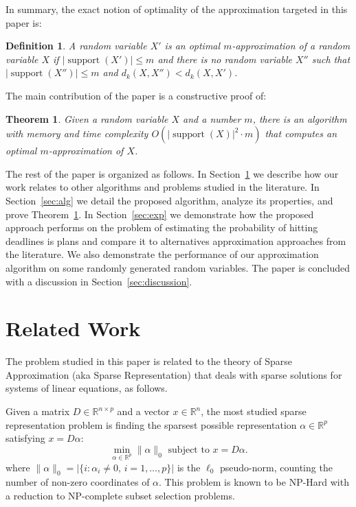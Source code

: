 \documentclass{article}
\newtheorem{definition}[thm]{Definition}
\newtheorem{theorem}[thm]{Theorem}
\DeclareMathOperator{\support}{support}
\begin{document}
In summary, the exact notion of optimality of the approximation targeted in this paper is:
\begin{definition}
	A random variable $X'$ is an optimal $m$-approximation of a random variable $X$ if $|\support(X')| \leq m$ and there is no random variable $X''$ such that $|\support(X'')| \leq m$ and $d_k(X,X'') < d_k(X,X')$.
\end{definition}

The main contribution of the paper is a constructive proof of:
\begin{theorem} \label{thm:main}
	Given a random variable $X$ and a number $m$, there is an algorithm with memory and time complexity $O(|\support(X)|^2 \cdot m)$  that computes an optimal $m$-approximation of $X$.
\end{theorem}

The rest of the paper is organized as follows. In Section~\ref{sec:rel-work} we describe how our work relates to other algorithms and problems studied in the literature. In Section~\ref{sec:alg} we detail the proposed algorithm, analyze its properties, and prove Theorem~\ref{thm:main}. In Section~\ref{sec:exp} we demonstrate how the proposed approach performs on the problem of estimating the probability of hitting deadlines is plans and compare it to alternatives approximation approaches from the literature. We also demonstrate the performance of our approximation algorithm on some randomly generated random variables. The paper is concluded with a discussion in Section~\ref{sec:discussion}.

\section{Related Work}
\label{sec:rel-work}
The problem studied in this paper is related to the theory of Sparse Approximation (aka Sparse Representation) that deals with sparse solutions for systems of linear equations, as follows. 

Given a matrix $D \in \mathbb{R}^{n \times p}$ and a vector $x \in \mathbb{R}^n$, the most studied sparse representation problem is finding the sparsest possible representation $\alpha \in \mathbb{R}^p$ satisfying $x = D\alpha$:
$$
\min_{\alpha \in \mathbb{R}^p} \|\alpha\|_0 \text{ subject to } x = D\alpha.
$$
where $\|\alpha\|_0 = |\{ i : \alpha_i \neq 0, \, i=1,\ldots,p \}|$ is the $\ell_0$ pseudo-norm, counting the number of non-zero coordinates of $\alpha$. This problem is known to be NP-Hard with a reduction to NP-complete subset selection problems.
\end{document}
